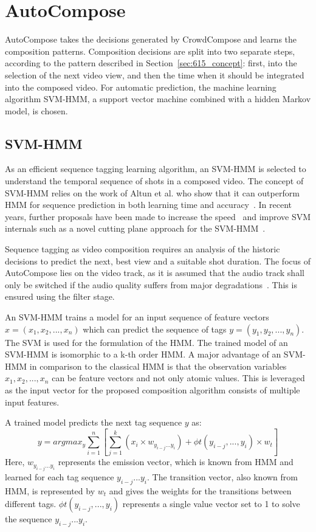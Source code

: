 \section{AutoCompose}
\label{sec:630_autocompose}
AutoCompose takes the decisions generated by CrowdCompose and learns the composition patterns. 
Composition decisions are split into two separate steps, according to the pattern described in Section~\ref{sec:615_concept}: first, into the selection of the next video view, and then the time when it should be integrated into the composed video.
For automatic prediction, the machine learning algorithm \ac{SVM-HMM}, a support vector machine combined with a hidden Markov model, is chosen.
\subsection{SVM-HMM}
As an efficient sequence tagging learning algorithm, an \ac{SVM-HMM} is selected to understand the temporal sequence of shots in a composed video.
The concept of \ac{SVM-HMM} relies on the work of Altun et al. who show that it can outperform \ac{HMM} for sequence prediction in both learning time and accuracy~\cite{Altun2003}.
In recent years, further proposals have been made to increase the speed~\cite{Tsochantaridis2004,Tsochantaridis2005} and improve \ac{SVM} internals such as a novel cutting plane approach for the \ac{SVM-HMM}~\cite{Joachims2009}.

Sequence tagging as video composition requires an analysis of the historic decisions to predict the next, best view and a suitable shot duration.
The focus of AutoCompose lies on the video track, as it is assumed that the audio track shall only be switched if the audio quality suffers from major degradations~\cite{Wu2015}.
This is ensured using the filter stage.

An \ac{SVM-HMM} trains a model for an input sequence of feature vectors $x=(x_1,x_2,...,x_n)$ which can predict the sequence of tags $y=(y_1,y_2,...,y_n)$.
The \ac{SVM} is used for the formulation of the \ac{HMM}. 
The trained model of an \ac{SVM-HMM} is isomorphic to a k-th order \ac{HMM}. 
A major advantage of an \ac{SVM-HMM} in comparison to the classical \ac{HMM} is that the observation variables $x_1,x_2,...,x_n$ can be feature vectors and not only atomic values. 
This is leveraged as the input vector for the proposed composition algorithm consists of multiple input features.

A trained model predicts the next tag sequence $y$ as:
\begin{equation}
y = argmax_y {\sum_{i=1}^{n}[\sum_{j=1}^{k} (x_i \times w_{y_{i-j}...y_i}) + \phi t(y_{i-j},...,y_i) \times w_t]}
\end{equation}
 Here, $w_{y_{i-j}...y_i}$ represents the emission vector, which is known from \ac{HMM} and learned for each tag sequence $y_{i-j}...y_i$. 
 The transition vector, also known from \ac{HMM}, is represented by $w_t$ and gives the weights for the transitions between different tags.
 $\phi t(y_{i-j},...,y_i)$ represents a single value vector set to 1 to solve the sequence $y_{i-j}...y_i$.
